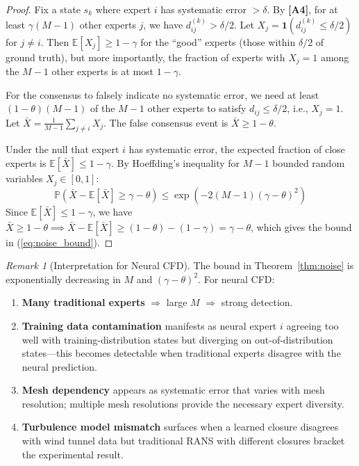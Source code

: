 \documentclass[11pt,a4paper]{article}
\theoremstyle{definition}
\theoremstyle{remark}
\newtheorem{remark}[theorem]{Remark}
\newcommand{\assumptionTag}[1]{\textsf{\textbf{[A#1]}}}
\newcommand{\E}{\mathbb{E}}
\newcommand{\Pbb}{\mathbb{P}}
\newcommand{\indicator}{\mathbf{1}}
\begin{document}
\begin{proof}
Fix a state $s_k$ where expert $i$ has systematic error $> \delta$.
By \assumptionTag{4}, for at least $\gamma (M-1)$ other experts $j$, we have $d_{ij}^{(k)} > \delta/2$.
Let $X_j = \indicator(d_{ij}^{(k)} \leq \delta/2)$ for $j \neq i$.
Then $\E[X_j] \geq 1-\gamma$ for the ``good'' experts (those within $\delta/2$ of ground truth), but more importantly, the fraction of experts with $X_j = 1$ among the $M-1$ other experts is at most $1 - \gamma$.

For the consensus to falsely indicate no systematic error, we need at least $(1-\theta)(M-1)$ of the $M-1$ other experts to satisfy $d_{ij} \leq \delta/2$, i.e., $X_j = 1$.
Let $\bar{X} = \frac{1}{M-1}\sum_{j \neq i} X_j$.
The false consensus event is $\bar{X} \geq 1 - \theta$.

Under the null that expert $i$ has systematic error, the expected fraction of close experts is $\E[\bar{X}] \leq 1 - \gamma$.
By Hoeffding's inequality for $M-1$ bounded random variables $X_j \in [0, 1]$:
\begin{equation}
\Pbb\left( \bar{X} - \E[\bar{X}] \geq \gamma - \theta \right) \leq \exp\left( -2(M-1)(\gamma - \theta)^2 \right)
\label{eq:hoeffding}
\end{equation}
Since $\E[\bar{X}] \leq 1-\gamma$, we have $\bar{X} \geq 1-\theta \implies \bar{X} - \E[\bar{X}] \geq (1-\theta) - (1-\gamma) = \gamma - \theta$, which gives the bound in (\ref{eq:noise_bound}).
\end{proof}

\begin{remark}[Interpretation for Neural CFD]
\label{rem:nn_interpretation}
The bound in Theorem~\ref{thm:noise} is exponentially decreasing in $M$ and $(\gamma-\theta)^2$.
For neural CFD:
\begin{enumerate}[label=(\roman*)]
    \item \textbf{Many traditional experts} $\Rightarrow$ large $M$ $\Rightarrow$ strong detection.
    \item \textbf{Training data contamination} manifests as neural expert $i$ agreeing too well with training-distribution states but diverging on out-of-distribution states---this becomes detectable when traditional experts disagree with the neural prediction.
    \item \textbf{Mesh dependency} appears as systematic error that varies with mesh resolution; multiple mesh resolutions provide the necessary expert diversity.
    \item \textbf{Turbulence model mismatch} surfaces when a learned closure disagrees with wind tunnel data but traditional RANS with different closures bracket the experimental result.
\end{enumerate}
\end{remark}
\end{document}
